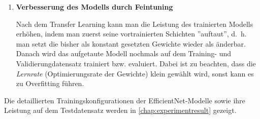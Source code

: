 \begin{enumerate}
	\item \textbf{Verbesserung des Modells durch Feintuning}
	
	Nach dem Transfer Learning kann man die Leistung des trainierten Modells erhöhen, indem man zuerst seine vortrainierten Schichten ''auftaut'', d.~h. man setzt die bisher als konstant gesetzten Gewichte wieder als änderbar. Danach wird das aufgetaute Modell nochmals auf dem Training- und Validierungdatensatz trainiert bzw. evaluiert. Dabei ist zu beachten, dass die \emph{Lernrate} (Optimierungsrate der Gewichte) klein gewählt wird, sonst kann es zu Overfitting führen.
\end{enumerate}

Die detaillierten Trainingskonfigurationen der EfficientNet-Modelle sowie ihre Leistung auf dem Testdatensatz werden in \autoref{chap:experimentresult} gezeigt.

